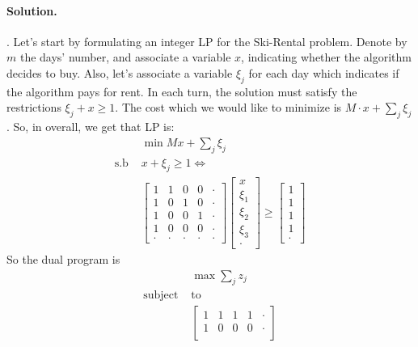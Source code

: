 \documentclass{article}
\begin{document}
\begin{multicols*}{2}
  \paragraph{Solution.}. Let's start by formulating an integer LP for the Ski-Rental problem. Denote by $m$ the days' number, and associate a variable $x$, indicating whether the algorithm decides to buy. Also, let's associate a variable $\xi_{j}$ for each day which indicates if the algorithm pays for rent. In each turn, the solution must satisfy the restrictions $ \xi_{j} + x  \ge 1$. The cost which we would like to minimize is $ M\cdot x + \sum_{j}{\xi_{j}}$. So, in overall, we get that LP is:    
  \begin{equation*}
    \begin{split}
      & \min{ Mx + \sum_{j}{\xi_{j}}} \\
      \text{s.b } & x + \xi_{j} \ge 1 \Leftrightarrow \\ 
      & \begin{bmatrix}
	1 & 1 & 0 & 0 & \cdot\\
	1 & 0 & 1 & 0 & \cdot\\
	1 & 0 & 0 & 1 & \cdot\\
	1 & 0 & 0 & 0 & \cdot\\
	\cdot & \cdot & \cdot & \cdot & \cdot
      \end{bmatrix} 
      \begin{bmatrix}
	x \\
	\xi_{1} \\ 
	\xi_{2} \\
	\xi_{3} \\
	\cdot 
      \end{bmatrix} \ge
      \begin{bmatrix}
	1 \\
	1 \\ 
	1 \\
	1 \\
	\cdot 
      \end{bmatrix}
    \end{split}
  \end{equation*}
  So the dual program is 
  \begin{equation*}
    \begin{split}
      & \max{ \sum_{j}{z_{j}}} \\
      \text{subject } &  \text{to}  \\ 
      & \begin{bmatrix}
	1 & 1 & 1 & 1 & \cdot \\
	1 & 0 & 0 & 0 & \cdot \\

\end{bmatrix}
\end{split}
\end{equation*}
\end{multicols*}
\end{document}
